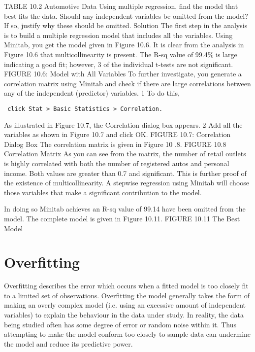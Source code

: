 \documentclass[]{report}
\begin{document}
TABLE 10.2 Automotive Data
Using multiple regression, find the model that best fits the data.
Should any independent variables be omitted from the model? If so, justify why these
should be omitted.
Solution
The first step in the analysis is to build a multiple regression model that includes all the
variables. Using Minitab, you get the model given in Figure 10.6.
It is clear from the analysis in Figure 10.6 that multicollinearity is present. The R-sq
value of 99.4\% is large indicating a good fit; however, 3 of the individual t-tests are not
significant.
FIGURE 10.6: Model with All Variables
To further investigate, you generate a correlation matrix using Minitab and check if
there are large correlations between any of the independent (predictor) variables.
1 To do this,
\begin{verbatim}
 click Stat > Basic Statistics > Correlation.
\end{verbatim}
 As illustrated in Figure
10.7, the Correlation dialog box appears.
2 Add all the variables as shown in Figure 10.7 and click OK.
FIGURE 10.7: Correlation Dialog Box
The correlation matrix is given in Figure 10 .8.
FIGURE 10.8 Correlation Matrix
As you can see from the matrix, the number of retail outlets is highly correlated with
both the number of registered autos and personal income. Both values are greater than
0.7 and significant. This is further proof of the existence of multicollinearity. A stepwise
regression using Minitab will choose those variables that make a significant
contribution to the model.

In doing so Minitab achieves an R-sq value of 99.14%
have been omitted from the model. The complete model is given in Figure 10.11.
FIGURE 10.11 The Best Model
\newpage



\section*{Overfitting}
Overfitting describes the error which occurs when a fitted model is too closely fit to a limited set of observations.
Overfitting the model generally takes the form of making an overly complex model (i.e. using an excessive
amount of independent variables) to explain the behaviour in the data under study. In reality, the data being
studied often has some degree of error or random noise within it. Thus attempting to make the model conform
too closely to sample data can undermine the model and reduce its predictive power.
\end{document}
